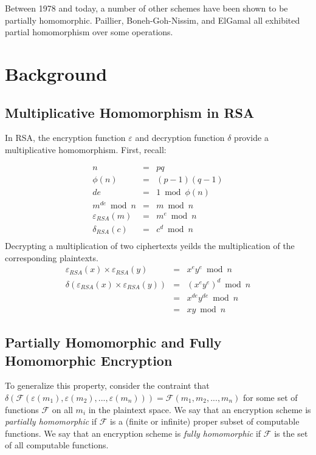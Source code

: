 \documentclass[a4paper,10pt]{article}
\begin{document}
Between 1978 and today, a number of other schemes have been shown to
be partially homomorphic. Paillier, Boneh-Goh-Nissim, and ElGamal all
exhibited partial homomorphism over some operations.

\section{Background}

\subsection{Multiplicative Homomorphism in RSA}
In RSA, the encryption function $\varepsilon$ and decryption function
$\delta$ provide a multiplicative homomorphism. First, recall:

\begin{eqnarray*}
n &=& pq\\
\phi(n) &=& (p-1)(q-1)\\
de &=& 1 \bmod \phi(n)\\
m^{de} \bmod n &=& m \bmod n\\
\varepsilon_{RSA}(m) &=& m^e \bmod n\\
\delta_{RSA}(c) &=& c^d \bmod n\\
\end{eqnarray*}
Decrypting a multiplication of two ciphertexts yeilds the multiplication of the corresponding plaintexts.
\begin{eqnarray*}
\varepsilon_{RSA}(x) \times \varepsilon_{RSA}(y) &=& x^e y^e \bmod n\\
\delta(\varepsilon_{RSA}(x) \times \varepsilon_{RSA}(y)) &=& (x^e y^e)^d \bmod n\\
&=& x^{de} y^{de} \bmod n\\
&=& x y \bmod n
\end{eqnarray*}

\subsection{Partially Homomorphic and Fully Homomorphic Encryption}
To generalize this property, consider the contraint that
$\delta(\mathcal{F}(\varepsilon(m_1), \varepsilon(m_2), ...,
\varepsilon(m_n))) = \mathcal{F}(m_1, m_2, ..., m_n)$ for some set of
functions $\mathcal{F}$ on all $m_i$ in the plaintext space. We say
that an encryption scheme is \textit{partially homomorphic} if
$\mathcal{F}$ is a (finite or infinite) proper subset of computable
functions. We say that an encryption scheme is \textit{fully
  homomorphic} if $\mathcal{F}$ is the set of all computable
functions.
\end{document}
